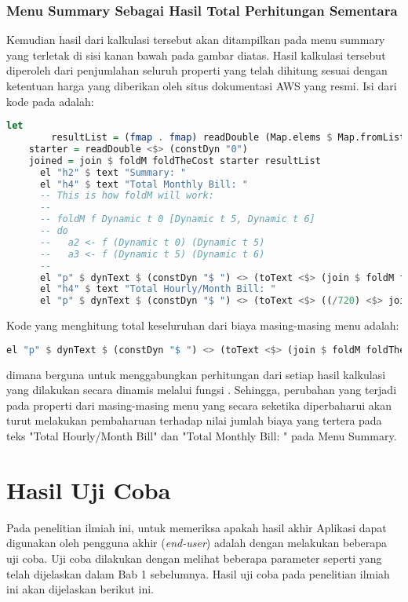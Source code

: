 \documentclass[pi.tex]{subfile}
\begin{document}
\subsubsection{Menu Summary Sebagai Hasil Total Perhitungan Sementara}\hspace{10pt}
   Kemudian hasil dari kalkulasi tersebut akan ditampilkan pada menu summary yang terletak di sisi kanan bawah pada gambar diatas. Hasil kalkulasi tersebut diperoleh dari penjumlahan seluruh properti yang telah dihitung sesuai dengan ketentuan harga yang diberikan oleh situs dokumentasi AWS yang resmi. Isi dari kode pada   adalah:\\ 
   \begin{lstlisting}[language=Haskell]
let
        resultList = (fmap . fmap) readDouble (Map.elems $ Map.fromList rightM)
	starter = readDouble <$> (constDyn "0")
	joined = join $ foldM foldTheCost starter resultList
      el "h2" $ text "Summary: "
      el "h4" $ text "Total Monthly Bill: "
      -- This is how foldM will work:
      --
      -- foldM f Dynamic t 0 [Dynamic t 5, Dynamic t 6]
      -- do
      --   a2 <- f (Dynamic t 0) (Dynamic t 5)
      --   a3 <- f (Dynamic t 5) (Dynamic t 6)
      --
      el "p" $ dynText $ (constDyn "$ ") <> (toText <$> (join $ foldM foldTheCost starter resultList))
      el "h4" $ text "Total Hourly/Month Bill: "
      el "p" $ dynText $ (constDyn "$ ") <> (toText <$> ((/720) <$> joined))
   \end{lstlisting}

  Kode yang menghitung total keseluruhan dari biaya masing-masing menu adalah:\\
     \begin{lstlisting}[language=Haskell]
  el "p" $ dynText $ (constDyn "$ ") <> (toText <$> (join $ foldM foldTheCost starter resultList))
     \end{lstlisting}

     dimana berguna untuk menggabungkan perhitungan dari setiap hasil kalkulasi yang dilakukan secara dinamis melalui fungsi . Sehingga, perubahan yang terjadi pada properti dari masing-masing menu yang secara seketika diperbaharui akan turut melakukan pembaharuan terhadap nilai jumlah biaya yang tertera pada teks "Total Hourly/Month Bill" dan "Total Monthly Bill: " pada Menu Summary.

     
\section{Hasil Uji Coba}
Pada penelitian ilmiah ini, untuk memeriksa apakah hasil akhir Aplikasi dapat digunakan oleh pengguna akhir (\emph{end-user}) adalah dengan melakukan beberapa uji coba. Uji coba dilakukan dengan melihat beberapa parameter seperti yang telah dijelaskan dalam Bab 1 sebelumnya. Hasil uji coba pada penelitian ilmiah ini akan dijelaskan berikut ini.
\end{document}
